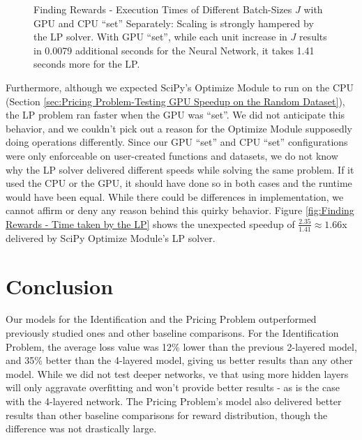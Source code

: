 \documentclass[12pt]{article}
\begin{document}
\begin{figure}[!htbp]
\begin{subfigure}{.49\textwidth}
            \label{fig:Finding Rewards - Time taken by the Neural Network}
        \end{subfigure}
        \vspace*{1em}
        \caption[Finding Rewards - Execution Times of Different Batch-Sizes $J$ with GPU and CPU ``set'' Separately]{Finding Rewards - Execution Times of Different Batch-Sizes $J$ with GPU and CPU ``set'' Separately: Scaling is strongly hampered by the LP solver. With GPU ``set'', while each unit increase in $J$ results in 0.0079 additional seconds for the Neural Network, it takes 1.41 seconds more for the LP.}
        \label{fig:Finding Rewards - Execution Times of Different Batch-Sizes J with GPU and CPU ``set'' Separately}
    \end{figure}

    Furthermore, although we expected SciPy's Optimize Module \cite{SCPOptimizeDocs} to run on the CPU (Section \ref{sec:Pricing Problem-Testing GPU Speedup on the Random Dataset}), the LP problem ran faster when the GPU was ``set''. We did not anticipate this behavior, and we couldn't pick out a reason for the Optimize Module supposedly doing operations differently. Since our GPU ``set'' and CPU ``set'' configurations were only enforceable on user-created functions and datasets, we do not know why the LP solver delivered different speeds while solving the same problem. If it used the CPU or the GPU, it should have done so in both cases and the runtime would have been equal. While there could be differences in implementation, we cannot affirm or deny any reason behind this quirky behavior. Figure \ref{fig:Finding Rewards - Time taken by the LP} shows the unexpected speedup of $\frac{2.35}{1.41} \approx 1.66$x delivered by SciPy Optimize Module's LP solver.
    
    \section{Conclusion} \label{sec:Conclusion}
    Our models for the Identification and the Pricing Problem outperformed previously studied ones and other baseline comparisons. For the Identification Problem, the average loss value was 12\% lower than the previous 2-layered model, and 35\% better than the 4-layered model, giving us better results than any other model. While we did not test deeper networks, ve that using more hidden layers will only aggravate overfitting and won't provide better results - as is the case with the 4-layered network. The Pricing Problem's model also delivered better results than other baseline comparisons for reward distribution, though the difference was not drastically large.
    
\end{document}
